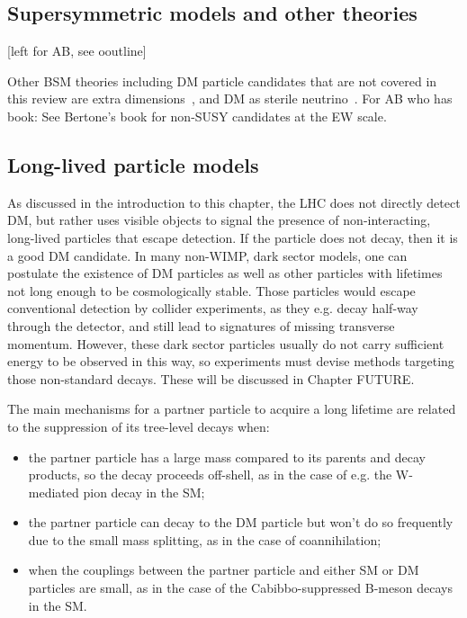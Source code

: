 
\subsection{Supersymmetric models and other theories}
\label{sec:SUSYModels}

[left for AB, see ooutline]

Other BSM theories including DM particle candidates that are not covered in this review are extra dimensions~\cite{Hooper:2007qk}, and DM as sterile neutrino~\cite{Adhikari:2016bei}. For AB who has book: See Bertone's book for non-SUSY candidates at the EW scale. 

\subsection{Long-lived particle models}
\label{sec:LLPModels}


As discussed in the introduction to this chapter, the LHC does not directly detect DM, but rather uses visible objects to signal the presence of non-interacting, long-lived particles that escape detection. If the particle does not decay, then it is a good DM candidate. In many non-WIMP, dark sector models, one can postulate the existence of DM particles as well as other particles with lifetimes not long enough to be cosmologically stable. Those particles would escape conventional detection by collider experiments, as they e.g. decay half-way through the detector, and still lead to signatures of missing transverse momentum. 
However, these dark sector particles usually do not carry sufficient energy to be observed in this way, so experiments must devise methods targeting those non-standard decays. These will be discussed in Chapter FUTURE.

The main mechanisms for a partner particle to acquire a long lifetime are related to the suppression of its tree-level decays when:
\begin{itemize}
\item the partner particle has a large mass compared to its parents and decay products, so the decay proceeds off-shell, as in the case of e.g. the W-mediated pion decay in the SM;
\item the partner particle can decay to the DM particle but won't do so frequently due to the small mass splitting, as in the case of coannihilation;
\item when the couplings between the partner particle and either SM or DM particles are small, as in the case  of the Cabibbo-suppressed B-meson decays in the SM. 
\end{itemize}


